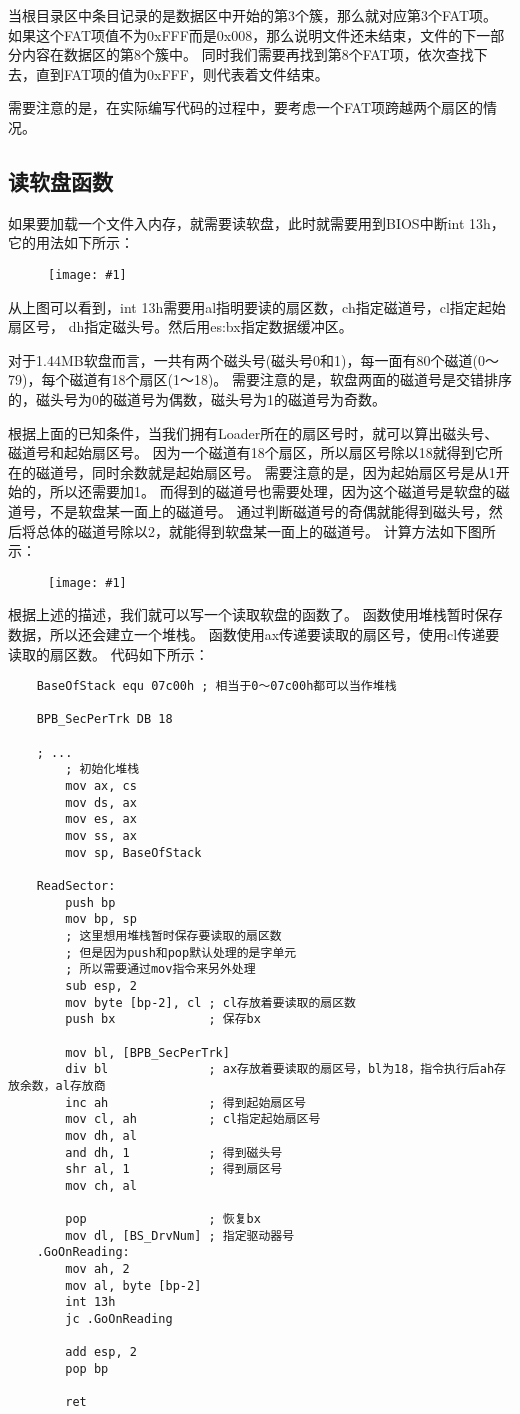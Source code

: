 \documentclass[a4paper,left=2.5cm,right=2.5cm,11pt]{article}
\newcommand{\fic}[1]{\begin{figure}[H]
		\center
		\texttt{[image: \#1]}
	\end{figure}}
\begin{document}
	当根目录区中条目记录的是数据区中开始的第3个簇，那么就对应第3个FAT项。
	如果这个FAT项值不为0xFFF而是0x008，那么说明文件还未结束，文件的下一部分内容在数据区的第8个簇中。
	同时我们需要再找到第8个FAT项，依次查找下去，直到FAT项的值为0xFFF，则代表着文件结束。\par

	需要注意的是，在实际编写代码的过程中，要考虑一个FAT项跨越两个扇区的情况。

\subsection{读软盘函数}
	如果要加载一个文件入内存，就需要读软盘，此时就需要用到BIOS中断int 13h，它的用法如下所示：
	\fic{1.png}

	从上图可以看到，int 13h需要用al指明要读的扇区数，ch指定磁道号，cl指定起始扇区号，
	dh指定磁头号。然后用es:bx指定数据缓冲区。\par

	对于1.44MB软盘而言，一共有两个磁头号(磁头号0和1)，每一面有80个磁道(0～79)，每个磁道有18个扇区(1～18)。
	需要注意的是，软盘两面的磁道号是交错排序的，磁头号为0的磁道号为偶数，磁头号为1的磁道号为奇数。\par

	根据上面的已知条件，当我们拥有Loader所在的扇区号时，就可以算出磁头号、磁道号和起始扇区号。
	因为一个磁道有18个扇区，所以扇区号除以18就得到它所在的磁道号，同时余数就是起始扇区号。
	需要注意的是，因为起始扇区号是从1开始的，所以还需要加1。
	而得到的磁道号也需要处理，因为这个磁道号是软盘的磁道号，不是软盘某一面上的磁道号。
	通过判断磁道号的奇偶就能得到磁头号，然后将总体的磁道号除以2，就能得到软盘某一面上的磁道号。
	计算方法如下图所示：
	\fic{2.png}

	根据上述的描述，我们就可以写一个读取软盘的函数了。
	函数使用堆栈暂时保存数据，所以还会建立一个堆栈。
	函数使用ax传递要读取的扇区号，使用cl传递要读取的扇区数。
	代码如下所示：
	\begin{lstlisting}
	BaseOfStack equ 07c00h ; 相当于0～07c00h都可以当作堆栈

	BPB_SecPerTrk DB 18

	; ...
		; 初始化堆栈
		mov ax, cs
		mov ds, ax
		mov es, ax
		mov ss, ax
		mov sp, BaseOfStack

	ReadSector:
		push bp
		mov bp, sp
		; 这里想用堆栈暂时保存要读取的扇区数
		; 但是因为push和pop默认处理的是字单元
		; 所以需要通过mov指令来另外处理
		sub esp, 2
		mov byte [bp-2], cl ; cl存放着要读取的扇区数
		push bx				; 保存bx

		mov bl, [BPB_SecPerTrk]
		div bl				; ax存放着要读取的扇区号，bl为18，指令执行后ah存放余数，al存放商
		inc ah				; 得到起始扇区号
		mov cl, ah			; cl指定起始扇区号
		mov dh, al			
		and dh, 1			; 得到磁头号
		shr al, 1			; 得到扇区号
		mov ch, al

		pop					; 恢复bx
		mov dl, [BS_DrvNum]	; 指定驱动器号
	.GoOnReading:
		mov ah, 2
		mov al, byte [bp-2]
		int 13h
		jc .GoOnReading

		add esp, 2
		pop bp

		ret
	\end{lstlisting}
\end{document}
